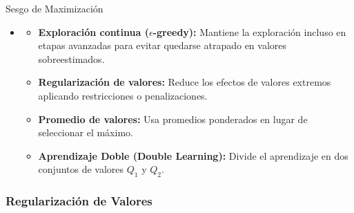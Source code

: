 \documentclass[10pt, envcountsect, handout, aspectratio=1610, hyperref={hypertexnames=true}]{beamer}
\begin{document}
\begin{frame}{Sesgo de Maximización}
\begin{itemize}
\begin{itemize}
			\item {} $\mathbb{E}\left[ \max_{a} Q(s, a) \right] > \max_{a} \mathbb{E}\left[ Q(s, a) \right]$
			
		\end{itemize}
		
		\item {}
		
		
		\begin{itemize}
			\item \textbf{Exploración continua ($\epsilon$-greedy):}  
			Mantiene la exploración incluso en etapas avanzadas para evitar quedarse atrapado en valores sobreestimados.
			
			
			\item \textbf{Regularización de valores:}  
			Reduce los efectos de valores extremos aplicando restricciones o penalizaciones.  
			
			\item \textbf{Promedio de valores:}  
			Usa promedios ponderados en lugar de seleccionar el máximo.  
			
			\item \textbf{Aprendizaje Doble (Double Learning):}  
			Divide el aprendizaje en dos conjuntos de valores $Q_1$ y $Q_2$.


		\end{itemize}
	\end{itemize}

\end{frame}









\subsubsection{Regularización de Valores}


\end{document}
